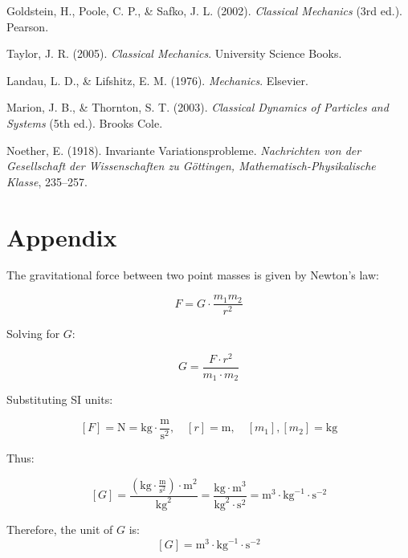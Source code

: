 \documentclass[conference]{IEEEtran}
\begin{document}
\begin{thebibliography}{9}

Goldstein, H., Poole, C. P., \& Safko, J. L. (2002). \textit{Classical Mechanics} (3rd ed.). Pearson.

Taylor, J. R. (2005). \textit{Classical Mechanics}. University Science Books.

Landau, L. D., \& Lifshitz, E. M. (1976). \textit{Mechanics}. Elsevier.

Marion, J. B., \& Thornton, S. T. (2003). \textit{Classical Dynamics of Particles and Systems} (5th ed.). Brooks Cole.

Noether, E. (1918). Invariante Variationsprobleme. \textit{Nachrichten von der Gesellschaft der Wissenschaften zu Göttingen, Mathematisch-Physikalische Klasse}, 235--257.

\end{thebibliography}


\section*{Appendix}

\begin{tcolorbox}[title=Note: Units of the Gravitational Constant \( G \), colback=blue!5!white, colframe=blue!75!black]
The gravitational force between two point masses is given by Newton's law:

\[
F = G \cdot \frac{m_1 m_2}{r^2}
\]

Solving for \( G \):

\[
G = \frac{F \cdot r^2}{m_1 \cdot m_2}
\]

Substituting SI units:

\[
[F] = \text{N} = \text{kg} \cdot \frac{\text{m}}{\text{s}^2}, \quad [r] = \text{m}, \quad [m_1], [m_2] = \text{kg}
\]

Thus:

\[
[G] = \frac{\left( \text{kg} \cdot \frac{\text{m}}{\text{s}^2} \right) \cdot \text{m}^2}{\text{kg}^2}
= \frac{\text{kg} \cdot \text{m}^3}{\text{kg}^2 \cdot \text{s}^2}
= \text{m}^3 \cdot \text{kg}^{-1} \cdot \text{s}^{-2}
\]

Therefore, the unit of \( G \) is:
\[
[G] = \text{m}^3 \cdot \text{kg}^{-1} \cdot \text{s}^{-2}
\]
\end{tcolorbox}
\end{document}
